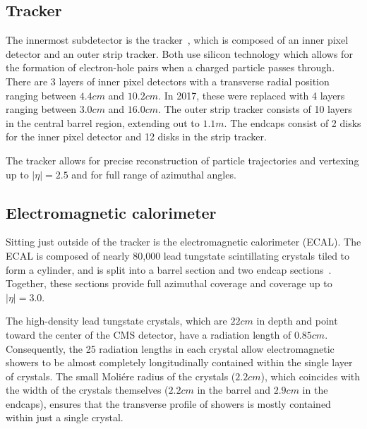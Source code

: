 \FloatBarrier

\subsection{Tracker}

The innermost subdetector is the
tracker~\cite{CMS:TRK11001,CMS:Dominguez1481838}, which is composed of an
inner pixel detector and an outer strip tracker. Both use silicon technology
which allows for the formation of electron-hole pairs when a charged particle
passes through.
There are 3 layers of inner
pixel detectors with a transverse radial position ranging between $4.4\unit{cm}$ and $10.2\unit{cm}$. In 2017,
these were replaced with 4 layers ranging between $3.0\unit{cm}$ and $16.0\unit{cm}$.
The outer strip tracker consists of 10 layers in the central barrel region, extending
out to $1.1\unit{m}$. The endcaps consist of 2 disks for the inner pixel detector
and 12 disks in the strip tracker.

The tracker allows for precise reconstruction of particle trajectories and 
vertexing up to $|\eta|=2.5$ and for full range of azimuthal angles.


\subsection{Electromagnetic calorimeter}

Sitting just outside of the tracker is the electromagnetic calorimeter (ECAL).
The ECAL is composed of nearly 80,000 lead tungstate scintillating crystals tiled to form a cylinder,
and is split into a barrel section and two endcap sections~\cite{CMS:Khachatryan2015hwa}.
Together, these sections provide full azimuthal coverage and coverage up to $|\eta|=3.0$.

The high-density lead tungstate crystals, which are $22\unit{cm}$ in depth
and point toward the center of the CMS detector,
have a radiation length of $0.85\unit{cm}$. Consequently, the 25 radiation
lengths in each crystal allow electromagnetic showers to be almost completely
longitudinally contained within the single layer of crystals. The small
Moli\'ere radius of the crystals ($2.2\unit{cm}$), which coincides with the
width of the crystals themselves ($2.2\unit{cm}$ in the barrel and
$2.9\unit{cm}$ in the endcaps), ensures that the transverse profile of
showers is mostly contained within just a single crystal.

